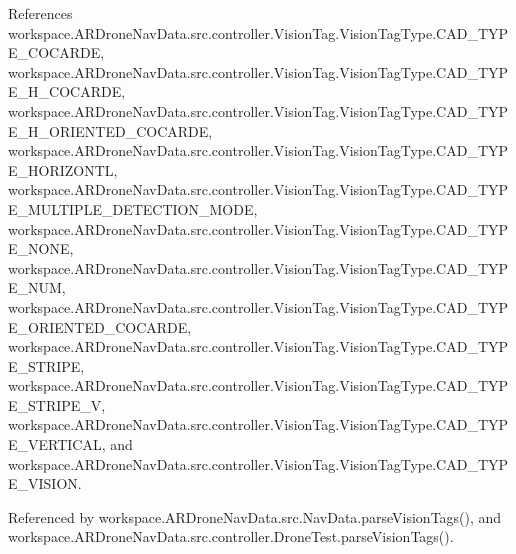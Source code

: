 References workspace.\+A\+R\+Drone\+Nav\+Data.\+src.\+controller.\+Vision\+Tag.\+Vision\+Tag\+Type.\+C\+A\+D\+\_\+\+T\+Y\+P\+E\+\_\+\+C\+O\+C\+A\+R\+D\+E, workspace.\+A\+R\+Drone\+Nav\+Data.\+src.\+controller.\+Vision\+Tag.\+Vision\+Tag\+Type.\+C\+A\+D\+\_\+\+T\+Y\+P\+E\+\_\+\+H\+\_\+\+C\+O\+C\+A\+R\+D\+E, workspace.\+A\+R\+Drone\+Nav\+Data.\+src.\+controller.\+Vision\+Tag.\+Vision\+Tag\+Type.\+C\+A\+D\+\_\+\+T\+Y\+P\+E\+\_\+\+H\+\_\+\+O\+R\+I\+E\+N\+T\+E\+D\+\_\+\+C\+O\+C\+A\+R\+D\+E, workspace.\+A\+R\+Drone\+Nav\+Data.\+src.\+controller.\+Vision\+Tag.\+Vision\+Tag\+Type.\+C\+A\+D\+\_\+\+T\+Y\+P\+E\+\_\+\+H\+O\+R\+I\+Z\+O\+N\+T\+L, workspace.\+A\+R\+Drone\+Nav\+Data.\+src.\+controller.\+Vision\+Tag.\+Vision\+Tag\+Type.\+C\+A\+D\+\_\+\+T\+Y\+P\+E\+\_\+\+M\+U\+L\+T\+I\+P\+L\+E\+\_\+\+D\+E\+T\+E\+C\+T\+I\+O\+N\+\_\+\+M\+O\+D\+E, workspace.\+A\+R\+Drone\+Nav\+Data.\+src.\+controller.\+Vision\+Tag.\+Vision\+Tag\+Type.\+C\+A\+D\+\_\+\+T\+Y\+P\+E\+\_\+\+N\+O\+N\+E, workspace.\+A\+R\+Drone\+Nav\+Data.\+src.\+controller.\+Vision\+Tag.\+Vision\+Tag\+Type.\+C\+A\+D\+\_\+\+T\+Y\+P\+E\+\_\+\+N\+U\+M, workspace.\+A\+R\+Drone\+Nav\+Data.\+src.\+controller.\+Vision\+Tag.\+Vision\+Tag\+Type.\+C\+A\+D\+\_\+\+T\+Y\+P\+E\+\_\+\+O\+R\+I\+E\+N\+T\+E\+D\+\_\+\+C\+O\+C\+A\+R\+D\+E, workspace.\+A\+R\+Drone\+Nav\+Data.\+src.\+controller.\+Vision\+Tag.\+Vision\+Tag\+Type.\+C\+A\+D\+\_\+\+T\+Y\+P\+E\+\_\+\+S\+T\+R\+I\+P\+E, workspace.\+A\+R\+Drone\+Nav\+Data.\+src.\+controller.\+Vision\+Tag.\+Vision\+Tag\+Type.\+C\+A\+D\+\_\+\+T\+Y\+P\+E\+\_\+\+S\+T\+R\+I\+P\+E\+\_\+\+V, workspace.\+A\+R\+Drone\+Nav\+Data.\+src.\+controller.\+Vision\+Tag.\+Vision\+Tag\+Type.\+C\+A\+D\+\_\+\+T\+Y\+P\+E\+\_\+\+V\+E\+R\+T\+I\+C\+A\+L, and workspace.\+A\+R\+Drone\+Nav\+Data.\+src.\+controller.\+Vision\+Tag.\+Vision\+Tag\+Type.\+C\+A\+D\+\_\+\+T\+Y\+P\+E\+\_\+\+V\+I\+S\+I\+O\+N.



Referenced by workspace.\+A\+R\+Drone\+Nav\+Data.\+src.\+Nav\+Data.\+parse\+Vision\+Tags(), and workspace.\+A\+R\+Drone\+Nav\+Data.\+src.\+controller.\+Drone\+Test.\+parse\+Vision\+Tags().


